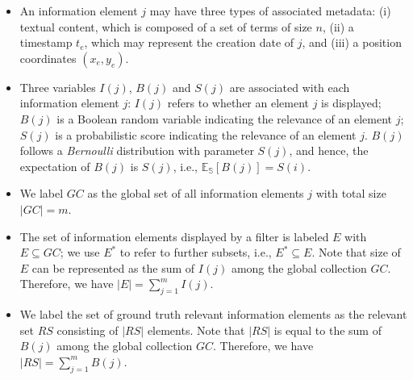 \begin{itemize}
\item An information element $j$ may have three types of associated metadata: (i) textual content, which is composed of a set of terms of size $n$, (ii) a timestamp $t_e$, which may represent the creation date of $j$, and (iii) a position coordinates $(x_{e},y_{e})$.
\item Three variables $I(j)$, $B(j)$ and $S(j)$ are associated with each information element $j$: $I(j)$ refers to whether an element $j$ is displayed; $B(j)$ is a Boolean random variable indicating the relevance of an element $j$; $S(j)$ is a probabilistic score indicating the relevance of an element $j$. %
$B(j)$ follows a \emph{Bernoulli} distribution with parameter $S(j)$, and hence, the expectation of $B(j)$ is $S(j)$, i.e., 
  $\mathbb{E_S}[B(j)] = S(i)$.
\item We label $GC$ as the global set of all information elements $j$ with total size $|GC|=m$. %
\item The set of information elements displayed by a filter is labeled $E$ with $E \subseteq  GC$; we use $E^*$ to refer to further subsets, i.e., $E^*\subseteq E$. 
Note that size of $E$ can be represented as the sum of $I(j)$ among the global collection $GC$. Therefore, we have $|E| = \sum_{j=1}^m I(j)$.
\item We label the set of ground truth relevant information elements as the relevant set $RS$ consisting of $|RS|$ elements. 
Note that $|RS|$ is equal to the sum of $B(j)$ among the global collection $GC$. Therefore, we have $|RS| = \sum_{j=1}^m B(j)$. %


\end{itemize}
